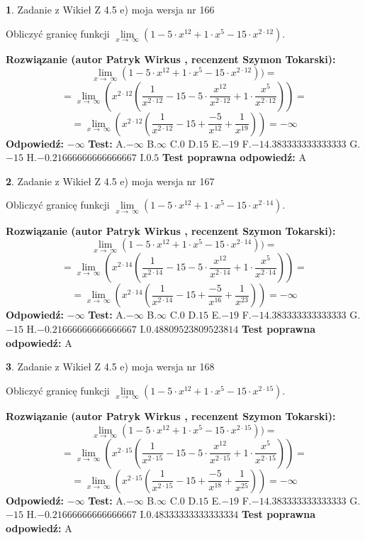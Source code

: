 \documentclass[12pt, a4paper]{article}
\theoremstyle{definition} %
\newtheorem{zad}{}
\newcommand{\zadStart}[1]{\begin{zad}#1\newline}
\newcommand{\zadStop}{\end{zad}}
\newcommand{\rozwStart}[2]{\noindent \textbf{Rozwiązanie (autor #1 , recenzent #2): }\newline}
\newcommand{\rozwStop}{\newline}
\newcommand{\odpStart}{\noindent \textbf{Odpowiedź:}\newline}
\newcommand{\odpStop}{\newline}
\newcommand{\testStart}{\noindent \textbf{Test:}\newline}
\newcommand{\testStop}{\newline}
\newcommand{\kluczStart}{\noindent \textbf{Test poprawna odpowiedź:}\newline}
\newcommand{\kluczStop}{\newline}
\begin{document}
\zadStart{Zadanie z Wikieł Z 4.5 e) moja wersja nr 166}


Obliczyć granicę funkcji  $\lim\limits_{x\to\ \infty}(1 - 5 \cdot x^{12}+1 \cdot x^{5}- 15 \cdot x^{2\cdot12})$.
\zadStop
\rozwStart{Patryk Wirkus}{Szymon Tokarski}
$$\lim\limits_{x\to\ \infty}(1 - 5 \cdot x^{12}+1 \cdot x^{5}- 15 \cdot x^{2\cdot12}))=$$
$$=\lim\limits_{x\to\ \infty}(x^{2\cdot12}(\frac{1}{x^{2\cdot12}}-15 -5 \cdot \frac{x^{12}}{x^{2\cdot12}}+1 \cdot \frac{x^{5}}{x^{2\cdot12}}))=$$
$$=\lim\limits_{x\to\ \infty}(x^{2\cdot12}(\frac{1}{x^{2\cdot12}}-15 + \frac{-5}{x^{12}}+ \frac{1}{x^{19}}))=-\infty$$
\rozwStop
\odpStart
$-\infty$
\odpStop
\testStart
A.$-\infty$ B.$\infty$ C.$0$ D.$15$ E.$-19$
F.$-14.383333333333333$ G.$-15$
H.$-0.21666666666666667$
I.$0.5$
\testStop
\kluczStart
A
\kluczStop



\zadStart{Zadanie z Wikieł Z 4.5 e) moja wersja nr 167}


Obliczyć granicę funkcji  $\lim\limits_{x\to\ \infty}(1 - 5 \cdot x^{12}+1 \cdot x^{5}- 15 \cdot x^{2\cdot14})$.
\zadStop
\rozwStart{Patryk Wirkus}{Szymon Tokarski}
$$\lim\limits_{x\to\ \infty}(1 - 5 \cdot x^{12}+1 \cdot x^{5}- 15 \cdot x^{2\cdot14}))=$$
$$=\lim\limits_{x\to\ \infty}(x^{2\cdot14}(\frac{1}{x^{2\cdot14}}-15 -5 \cdot \frac{x^{12}}{x^{2\cdot14}}+1 \cdot \frac{x^{5}}{x^{2\cdot14}}))=$$
$$=\lim\limits_{x\to\ \infty}(x^{2\cdot14}(\frac{1}{x^{2\cdot14}}-15 + \frac{-5}{x^{16}}+ \frac{1}{x^{23}}))=-\infty$$
\rozwStop
\odpStart
$-\infty$
\odpStop
\testStart
A.$-\infty$ B.$\infty$ C.$0$ D.$15$ E.$-19$
F.$-14.383333333333333$ G.$-15$
H.$-0.21666666666666667$
I.$0.48809523809523814$
\testStop
\kluczStart
A
\kluczStop



\zadStart{Zadanie z Wikieł Z 4.5 e) moja wersja nr 168}


Obliczyć granicę funkcji  $\lim\limits_{x\to\ \infty}(1 - 5 \cdot x^{12}+1 \cdot x^{5}- 15 \cdot x^{2\cdot15})$.
\zadStop
\rozwStart{Patryk Wirkus}{Szymon Tokarski}
$$\lim\limits_{x\to\ \infty}(1 - 5 \cdot x^{12}+1 \cdot x^{5}- 15 \cdot x^{2\cdot15}))=$$
$$=\lim\limits_{x\to\ \infty}(x^{2\cdot15}(\frac{1}{x^{2\cdot15}}-15 -5 \cdot \frac{x^{12}}{x^{2\cdot15}}+1 \cdot \frac{x^{5}}{x^{2\cdot15}}))=$$
$$=\lim\limits_{x\to\ \infty}(x^{2\cdot15}(\frac{1}{x^{2\cdot15}}-15 + \frac{-5}{x^{18}}+ \frac{1}{x^{25}}))=-\infty$$
\rozwStop
\odpStart
$-\infty$
\odpStop
\testStart
A.$-\infty$ B.$\infty$ C.$0$ D.$15$ E.$-19$
F.$-14.383333333333333$ G.$-15$
H.$-0.21666666666666667$
I.$0.48333333333333334$
\testStop
\kluczStart
A
\kluczStop
\end{document}
